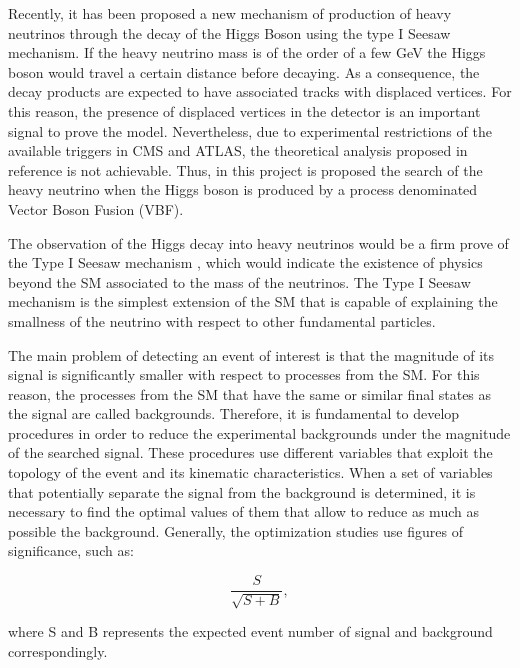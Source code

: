 Recently, it has been proposed a new mechanism of production of heavy neutrinos through the decay of the Higgs Boson \cite{Seesaw Mechanism with displaced vertices} using the type I Seesaw mechanism. If the heavy neutrino mass is of the order of a few GeV the Higgs boson would travel a certain distance before decaying. As a consequence, the decay products are expected to have associated tracks with displaced vertices. For this reason, the presence of displaced vertices in the detector is an important signal to prove the model. Nevertheless, due to experimental restrictions of the available triggers in CMS and ATLAS, the theoretical analysis proposed in reference \cite{Seesaw Mechanism with displaced vertices} is not achievable. Thus, in this project is proposed the search of the heavy neutrino when the Higgs boson is produced by a process denominated Vector Boson Fusion (VBF).

The observation of the Higgs decay into heavy neutrinos would be a firm prove of the Type I Seesaw mechanism \cite{Type I Seesaw Mechanism}, which would indicate the existence of physics beyond the SM associated to the mass of the neutrinos. The Type I Seesaw mechanism is the simplest extension of the SM that is capable of explaining the smallness of the neutrino with respect to other fundamental particles. 

The main problem of detecting an event of interest is that the magnitude of its signal is significantly smaller with respect to processes from the SM. For this reason, the processes from the SM that have the same or similar final states as the signal are called backgrounds. Therefore, it is fundamental to develop procedures in order to reduce the experimental backgrounds under the magnitude of the searched signal. These procedures use different variables that exploit the topology of the event and its kinematic characteristics. When a set of variables that potentially separate the signal from the background is determined, it is necessary to find the optimal values of them that allow to reduce as much as possible the background. Generally, the optimization studies use figures of significance, such as: 

\begin{equation}
    \frac{S}{\sqrt{S+B}},
\end{equation}

where S and B represents the expected event number of signal and background correspondingly.

